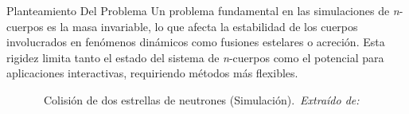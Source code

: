 \begin{frame}{Planteamiento Del Problema}%
    \vspace{-0.15cm}
    {\fontsize{8pt}{10pt}\selectfont
    Un problema fundamental en las simulaciones de \textit{n}-cuerpos es la masa invariable, lo que afecta la estabilidad de los cuerpos involucrados en fenómenos dinámicos como fusiones estelares o acreción. Esta rigidez limita tanto el estado del sistema de \textit{n}-cuerpos como el potencial para aplicaciones interactivas, requiriendo métodos más flexibles.}
    \vspace{0cm}
    \begin{figure}[H]
        \centering
        \href{run:C:/Users/emicr/Documents/ESCOLARES/ESCOM/TRABAJO TERMINAL/Presentacion/img/introduccion/Neutron_Star_Merger_high.mp4}{%
        }
        \vspace{-0.25cm}
        \caption{\tiny~Colisión de dos estrellas de neutrones (Simulación).~\textit{Extraído de:}~\cite{nasa_star_collision_2018}}%
        \label{fig:neutron_star_merger}
    \end{figure}
\end{frame}

